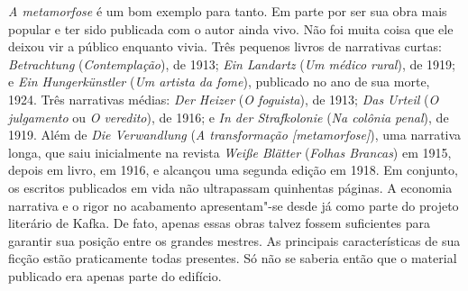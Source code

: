 \textit{A metamorfose} é um bom exemplo para tanto. Em parte por ser sua
obra mais popular e ter sido publicada com o autor ainda vivo. Não
foi muita coisa que ele deixou vir a público enquanto vivia. Três pequenos livros de narrativas curtas:
\textit{Betrachtung} (\textit{Contemplação}), de 1913; \textit{Ein
Landartz} (\textit{Um médico rural}), de 1919; e \textit{Ein
Hungerkünstler} (\textit{Um artista da fome}), publicado no ano de sua
morte, 1924. Três narrativas médias: \textit{Der Heizer} (\textit{O
foguista}), de 1913; \textit{Das Urteil} (\textit{O julgamento} ou
\textit{O veredito}), de 1916; e \textit{In der Strafkolonie}
(\textit{Na colônia penal}), de 1919. Além de \textit{Die Verwandlung}
(\textit{A transformação [metamorfose]}), uma narrativa
longa, que saiu inicialmente na revista \textit{Weiße Blätter}
(\textit{Folhas Brancas}) em 1915, depois em livro, em 1916, e alcançou
uma segunda edição em 1918. Em conjunto, os escritos publicados em vida
não ultrapassam quinhentas páginas. A economia narrativa e o rigor no acabamento
apresentam"-se desde já como parte do projeto literário de Kafka. De
fato, apenas essas obras talvez fossem suficientes para garantir sua
posição entre os grandes mestres. As principais características de sua
ficção estão praticamente todas presentes. Só não se saberia então que
o material publicado era apenas parte do edifício.

